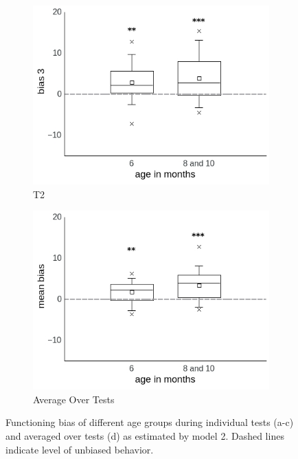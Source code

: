 \documentclass[a4paper]{scrreprt}
\begin{document}
\begin{figure}
    \begin{subfigure}[b]{0.49\textwidth}
        \includegraphics[width=\textwidth]{figs/sec3/age/age2_diff3_mod2.jpeg}
        \caption{T2}
    \end{subfigure}
    \begin{subfigure}[b]{0.49\textwidth}
        \includegraphics[width=\textwidth]{figs/sec3/age/age2_diff_mean_mod2.jpeg}
        \caption{Average Over Tests}
    \end{subfigure}
\caption{Functioning bias of different age groups during individual tests (a-c) and averaged over tests (d) as estimated by model 2. Dashed lines indicate level of unbiased behavior.}
\label{fig:age2_diff_mod2}
\end{figure}
\end{document}
